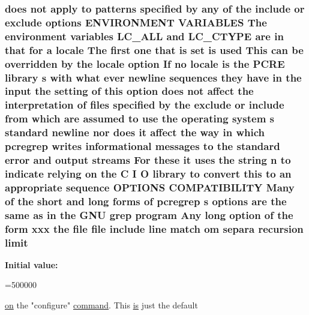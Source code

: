 \subsubsection[{\texorpdfstring{limit}{limit}}]{ does {\bf not} apply {\bf to} {\bf patterns} {\bf specified} by {\bf any} {\bf of} the {\bf include} {\bf or} {\bf exclude} {\bf options} E\+N\+V\+I\+R\+O\+N\+M\+E\+NT V\+A\+R\+I\+A\+B\+L\+ES The {\bf environment} {\bf variables} L\+C\+\_\+\+A\+LL and L\+C\+\_\+\+C\+T\+Y\+PE {\bf are} {\bf in} that for {\bf a} {\bf locale} The {\bf first} one that {\bf is} {\bf set} {\bf is} {\bf used} This {\bf can} {\bf be} overridden by the {\bf locale} {\bf option} If no {\bf locale} {\bf is} the {\bf P\+C\+RE} {\bf library} {\bf s} {\bf with} {\bf what} {\bf ever} {\bf newline} sequences they have {\bf in} the {\bf input} the {\bf setting} {\bf of} {\bf this} {\bf option} does {\bf not} affect the interpretation {\bf of} {\bf files} {\bf specified} by the {\bf exclude} {\bf or} {\bf include} {\bf from} {\bf which} {\bf are} assumed {\bf to} use the operating {\bf system} {\bf s} standard {\bf newline} nor does {\bf it} affect the {\bf way} {\bf in} {\bf which} pcregrep writes informational messages {\bf to} the standard {\bf error} and {\bf output} streams For these {\bf it} uses the {\bf string} {\bf n} {\bf to} indicate relying {\bf on} the {\bf C} {\bf I} O {\bf library} {\bf to} convert {\bf this} {\bf to} an appropriate {\bf sequence} {\bf O\+P\+T\+I\+O\+NS} C\+O\+M\+P\+A\+T\+I\+B\+I\+L\+I\+TY Many {\bf of} the short and long forms {\bf of} pcregrep {\bf s} {\bf options} {\bf are} the same {\bf as} {\bf in} the G\+NU {\bf grep} {\bf program} Any long {\bf option} {\bf of} the form {\bf xxx} the {\bf file} {\bf file} {\bf include} {\bf line} {\bf match} om separa {\bf recursion} limit}\hypertarget{group__apr__thread__proc_ga915cb5b6b271c146b5198c51cff16f9a}{}\label{group__apr__thread__proc_ga915cb5b6b271c146b5198c51cff16f9a}
{\bfseries Initial value\+:}
\begin{DoxyCode}
=500000

  \hyperlink{group__apr__thread__proc_gade8f959a935ed315f9f55422c7de9903}{on} the \textcolor{stringliteral}{"configure"} \hyperlink{pcre_8txt_af29527e37cc7b19ef4261feb5b8a831d}{command}. This \hyperlink{pcre_8txt_a7d947c770a43ed118ff283c41a1b303c}{is} just the \textcolor{keywordflow}{default}
\end{DoxyCode}
